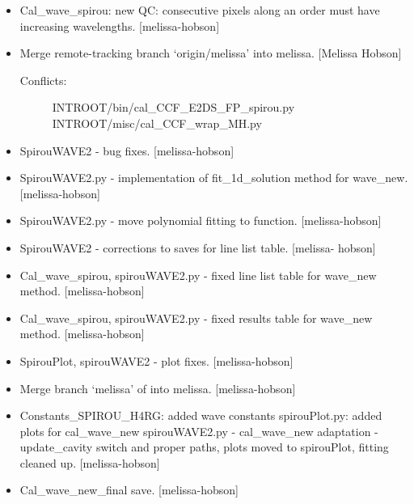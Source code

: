 \documentclass[a4paper,10pt,english]{report}
\begin{document}
\begin{itemize}
\begin{description}
\end{description}

\item {} 
Cal\_wave\_spirou: new QC: consecutive pixels along an order must have
increasing wavelengths. {[}melissa-hobson{]}

\item {} 
Merge remote-tracking branch ‘origin/melissa’ into melissa. {[}Melissa
Hobson{]}
\begin{description}
\item[{Conflicts:}] \leavevmode
INTROOT/bin/cal\_CCF\_E2DS\_FP\_spirou.py
INTROOT/misc/cal\_CCF\_wrap\_MH.py

\end{description}

\item {} 
SpirouWAVE2 - bug fixes. {[}melissa-hobson{]}

\item {} 
SpirouWAVE2.py - implementation of fit\_1d\_solution method for
wave\_new. {[}melissa-hobson{]}

\item {} 
SpirouWAVE2.py - move polynomial fitting to function. {[}melissa-hobson{]}

\item {} 
SpirouWAVE2 - corrections to saves for line list table. {[}melissa-
hobson{]}

\item {} 
Cal\_wave\_spirou, spirouWAVE2.py - fixed line list table for wave\_new
method. {[}melissa-hobson{]}

\item {} 
Cal\_wave\_spirou, spirouWAVE2.py - fixed results table for wave\_new
method. {[}melissa-hobson{]}

\item {} 
SpirouPlot, spirouWAVE2 - plot fixes. {[}melissa-hobson{]}

\item {} 
Merge branch ‘melissa’ of  into
melissa. {[}melissa-hobson{]}

\item {} 
Constants\_SPIROU\_H4RG: added wave constants spirouPlot.py: added plots
for cal\_wave\_new spirouWAVE2.py - cal\_wave\_new adaptation -
update\_cavity switch and proper paths, plots moved to spirouPlot,
fitting cleaned up. {[}melissa-hobson{]}

\item {} 
Cal\_wave\_new\_final save. {[}melissa-hobson{]}


\end{itemize}
\end{document}
